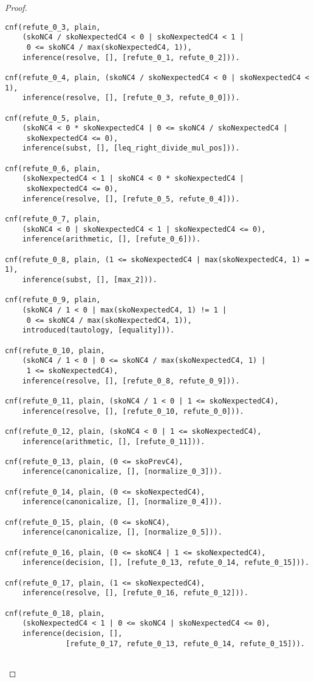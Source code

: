 \begin{proof}
\begin{verbatim}
cnf(refute_0_3, plain,
    (skoNC4 / skoNexpectedC4 < 0 | skoNexpectedC4 < 1 |
     0 <= skoNC4 / max(skoNexpectedC4, 1)),
    inference(resolve, [], [refute_0_1, refute_0_2])).

cnf(refute_0_4, plain, (skoNC4 / skoNexpectedC4 < 0 | skoNexpectedC4 < 1),
    inference(resolve, [], [refute_0_3, refute_0_0])).

cnf(refute_0_5, plain,
    (skoNC4 < 0 * skoNexpectedC4 | 0 <= skoNC4 / skoNexpectedC4 |
     skoNexpectedC4 <= 0),
    inference(subst, [], [leq_right_divide_mul_pos])).

cnf(refute_0_6, plain,
    (skoNexpectedC4 < 1 | skoNC4 < 0 * skoNexpectedC4 |
     skoNexpectedC4 <= 0),
    inference(resolve, [], [refute_0_5, refute_0_4])).

cnf(refute_0_7, plain,
    (skoNC4 < 0 | skoNexpectedC4 < 1 | skoNexpectedC4 <= 0),
    inference(arithmetic, [], [refute_0_6])).

cnf(refute_0_8, plain, (1 <= skoNexpectedC4 | max(skoNexpectedC4, 1) = 1),
    inference(subst, [], [max_2])).

cnf(refute_0_9, plain,
    (skoNC4 / 1 < 0 | max(skoNexpectedC4, 1) != 1 |
     0 <= skoNC4 / max(skoNexpectedC4, 1)),
    introduced(tautology, [equality])).

cnf(refute_0_10, plain,
    (skoNC4 / 1 < 0 | 0 <= skoNC4 / max(skoNexpectedC4, 1) |
     1 <= skoNexpectedC4),
    inference(resolve, [], [refute_0_8, refute_0_9])).

cnf(refute_0_11, plain, (skoNC4 / 1 < 0 | 1 <= skoNexpectedC4),
    inference(resolve, [], [refute_0_10, refute_0_0])).

cnf(refute_0_12, plain, (skoNC4 < 0 | 1 <= skoNexpectedC4),
    inference(arithmetic, [], [refute_0_11])).

cnf(refute_0_13, plain, (0 <= skoPrevC4),
    inference(canonicalize, [], [normalize_0_3])).

cnf(refute_0_14, plain, (0 <= skoNexpectedC4),
    inference(canonicalize, [], [normalize_0_4])).

cnf(refute_0_15, plain, (0 <= skoNC4),
    inference(canonicalize, [], [normalize_0_5])).

cnf(refute_0_16, plain, (0 <= skoNC4 | 1 <= skoNexpectedC4),
    inference(decision, [], [refute_0_13, refute_0_14, refute_0_15])).

cnf(refute_0_17, plain, (1 <= skoNexpectedC4),
    inference(resolve, [], [refute_0_16, refute_0_12])).

cnf(refute_0_18, plain,
    (skoNexpectedC4 < 1 | 0 <= skoNC4 | skoNexpectedC4 <= 0),
    inference(decision, [],
              [refute_0_17, refute_0_13, refute_0_14, refute_0_15])).


\end{verbatim}
\end{proof}
